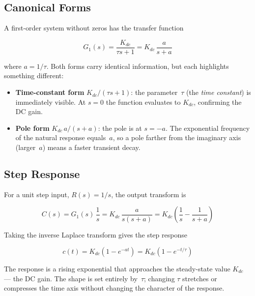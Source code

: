 \documentclass[../../book.tex]{subfiles}
\begin{document}
\subsection{Canonical Forms}
\label{sec:first_forms}

A first-order system without zeros has the transfer function

\begin{equation}
  G_1(s) = \frac{K_{dc}}{\tau s + 1} = K_{dc}\,\frac{a}{s+a}
  \label{eq:G1}
\end{equation}

where $a = 1/\tau$.  Both forms carry identical information, but each
highlights something different:

\begin{itemize}
  \item \textbf{Time-constant form} $K_{dc}/(\tau s+1)$: the parameter~$\tau$
    (the \emph{time constant}) is immediately visible.  At $s=0$ the function
    evaluates to $K_{dc}$, confirming the DC gain.
  \item \textbf{Pole form} $K_{dc}\,a/(s+a)$: the pole is at $s = -a$.  The
    exponential frequency of the natural response equals~$a$, so a pole farther
    from the imaginary axis (larger~$a$) means a faster transient decay.
\end{itemize}

\subsection{Step Response}
\label{sec:first_step}

For a unit step input, $R(s) = 1/s$, the output transform is

\[
  C(s) = G_1(s)\,\frac{1}{s} = K_{dc}\,\frac{a}{s(s+a)}
       = K_{dc}\left(\frac{1}{s} - \frac{1}{s+a}\right)
\]

Taking the inverse Laplace transform gives the step response

\begin{equation}
  \boxed{c(t) = K_{dc}\!\left(1 - e^{-at}\right) = K_{dc}\!\left(1 - e^{-t/\tau}\right)}
  \label{eq:first_step}
\end{equation}

The response is a rising exponential that approaches the steady-state value
$K_{dc}$ --- the DC gain.  The shape is set entirely by~$\tau$; changing $\tau$
stretches or compresses the time axis without changing the character of the
response.
\end{document}
